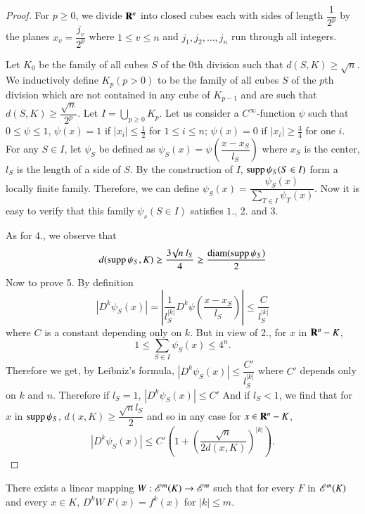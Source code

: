 \begin{proof}
For $p\geq 0$, we divide $\mathbf{R}^{n}$ into closed cubes each with sides of length $\dfrac{1}{2^{p}}$ by the planes $x_{v}=\dfrac{j_{v}}{2^{p}}$ where $1\leq v\leq n$ and $j_{1},j_{2},\ldots, j_{n}$ run through all integers.

Let $K_{0}$ be the family of all cubes $S$ of the 0th division such that $d(S,K)\geq \surd n$. We inductively define $K_{p}(p>0)$ to be the family of all cubes $S$ of the $p$th division which are not contained in any cube of $K_{p-1}$ and are such that $d(S,K)\geq \dfrac{\surd n}{2^{p}}$. Let $I=\bigcup\limits_{p\geq 0}K_{p}$. Let us consider a $C^{\infty}$-function $\psi$ such that $0\leq \psi \leq 1$, $\psi(x)=1$ if $|x_{i}|\leq \frac{1}{2}$ for $1\leq i\leq n$; $\psi(x)=0$ if $|x_{i}|\geq \frac{3}{4}$ for one $i$. For any $S\in I$, let $\psi_{S}$ be defined as $\psi_{S}(x)=\psi\left(\dfrac{x-x_{S}}{l_{S}}\right)$ where $x_{S}$ is the center, $l_{S}$ is the length of a side of $S$. By the construction of $I$, $\operatorname{supp} \psi_{S}(S\in I)$ form a locally finite family. Therefore, we can define $\psi_{S}(x)=\dfrac{\psi_{S}(x)}{\sum\limits_{T\in I}\psi_{T}(x)}$. Now it is easy to verify that this family $\psi_{s}(S\in I)$ satisfies $1$., 2. and 3.

As for 4., we observe that
$$
d(\operatorname{supp} \psi_{S},K)\geq \dfrac{3\surd n \ l_{S}}{4}\geq \dfrac{\operatorname{diam} (\operatorname{supp} \psi_{S})}{2}
$$
Now to prove 5. By definition
$$
|D^{k}\psi_{S}(x)|=\left|\dfrac{1}{l^{|k|}_{S}}D^{k}\psi\left(\dfrac{x-x_{S}}{l_{S}}\right)\right|\leq \dfrac{C}{l^{|k|}_{S}}
$$
where $C$ is a constant depending only on $k$. But in view of 2., for $x$ in $\mathbf{R}^{n}-K$,
$$
1\leq \sum\limits_{S\in I}\psi_{S}(x)\leq 4^{n}.
$$
Therefore we get, by Leibniz's formula, $|D^{k}\psi_{S}(x)|\leq \dfrac{C'}{l^{|k|}_{S}}$ where $C'$ depends only on $k$ and $n$. Therefore if $l_{S}=1$, $|D^{k}\psi_{S}(x)|\leq C'$ And if $l_{S}<1$, we find that for $x$ in $\operatorname{supp}\psi_{S}$, $d(x,K)\geq \dfrac{\surd nl_{S}}{2}$ and so in any case for $x\in \mathbf{R}^{n}-K$,
$$
\left|D^{k}\psi_{S}(x)\right|\leq C'\left(1+\left(\dfrac{\surd n}{2d(x,K)}\right)^{|k|}\right).
$$
\end{proof}

\begin{theorem}[Whitney {[1]}.]\label{chap1-thm3.2}
There exists a linear mapping $W:\mathscr{E}^{m}(K)\to \mathscr{E}^{m}$ such that for every $F$ in $\mathscr{E}^{m}(K)$ and every $x\in K$, $D^{k}W \ F(x)=f^{k}(x)$ for $|k|\leq m$.
\end{theorem}

